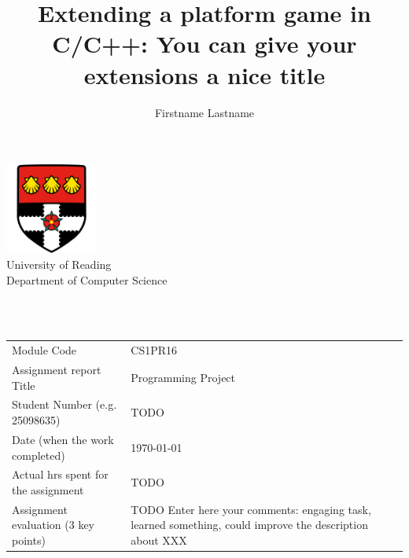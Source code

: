 \documentclass[a4paper,11pt]{article}
\title{Extending a platform game in C/C++: You can give your extensions a nice title}
\author{Firstname Lastname}
\begin{document}


    \begin{titlepage}
        \begin{center}
            \includegraphics[width=3cm]{figures/uorlogo.png}\\[0.5cm]
            {\LARGE University of Reading\\[0.5cm]
                Department of Computer Science}\\[2cm]

            \linespread{1.2}\huge {\thetitle}


            \linespread{1}~\\[2cm]

            {\Large \theauthor} \\[1cm]



            \normalsize
            \vfill
            \begin{tabular}{lp{10cm}}
            Module Code & CS1PR16 \\
            Assignment report Title &  Programming Project \\
            Student Number (e.g. 25098635)        & TODO \\
            Date (when the work completed)        & \today \\
            Actual hrs spent for the assignment   & TODO   \\
            Assignment evaluation (3 key points)  & TODO Enter here your comments: engaging task, learned something, could improve the description about XXX
            \end{tabular}
        \end{center}
    \end{titlepage}
\end{document}
